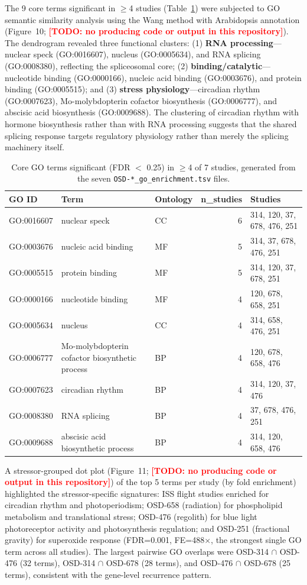 \documentclass[12pt,a4paper]{article}
\newcommand{\TODO}[1]{\textcolor{red}{\textbf{[TODO: #1]}}}
\begin{document}
The 9 core terms significant in $\geq$4 studies (Table~\ref{tab:core_go}) were subjected to GO semantic similarity analysis using the Wang method with Arabidopsis annotation (Figure~10; \TODO{no producing code or output in this repository}). The dendrogram revealed three functional clusters: (1) \textbf{RNA processing}---nuclear speck (GO:0016607), nucleus (GO:0005634), and RNA splicing (GO:0008380), reflecting the spliceosomal core; (2) \textbf{binding/catalytic}---nucleotide binding (GO:0000166), nucleic acid binding (GO:0003676), and protein binding (GO:0005515); and (3) \textbf{stress physiology}---circadian rhythm (GO:0007623), Mo-molybdopterin cofactor biosynthesis (GO:0006777), and abscisic acid biosynthesis (GO:0009688). The clustering of circadian rhythm with hormone biosynthesis rather than with RNA processing suggests that the shared splicing response targets regulatory physiology rather than merely the splicing machinery itself.

\begin{table}[htbp]
\centering
\caption{Core GO terms significant (FDR $<$ 0.25) in $\geq$4 of 7 studies, generated from the seven \texttt{OSD-*\_go\_enrichment.tsv} files.}
\label{tab:core_go}
\small
\begin{tabularx}{\textwidth}{l>{\raggedright\arraybackslash}Xlrl}
\hline
GO ID & Term & Ontology & n\_studies & Studies \\
\hline
GO:0016607 & nuclear speck & CC & 6 & 314, 120, 37, 678, 476, 251 \\
GO:0003676 & nucleic acid binding & MF & 5 & 314, 37, 678, 476, 251 \\
GO:0005515 & protein binding & MF & 5 & 314, 120, 37, 678, 251 \\
GO:0000166 & nucleotide binding & MF & 4 & 120, 678, 658, 251 \\
GO:0005634 & nucleus & CC & 4 & 314, 658, 476, 251 \\
GO:0006777 & Mo-molybdopterin cofactor biosynthetic process & BP & 4 & 120, 678, 658, 476 \\
GO:0007623 & circadian rhythm & BP & 4 & 314, 120, 37, 476 \\
GO:0008380 & RNA splicing & BP & 4 & 37, 678, 476, 251 \\
GO:0009688 & abscisic acid biosynthetic process & BP & 4 & 314, 120, 658, 476 \\
\hline
\end{tabularx}
\end{table}

A stressor-grouped dot plot (Figure~11; \TODO{no producing code or output in this repository}) of the top 5 terms per study (by fold enrichment) highlighted the stressor-specific signatures: ISS flight studies enriched for circadian rhythm and photoperiodism; OSD-658 (radiation) for phospholipid metabolism and translational stress; OSD-476 (regolith) for blue light photoreceptor activity and photosynthesis regulation; and OSD-251 (fractional gravity) for superoxide response (FDR=0.001, FE=488$\times$, the strongest single GO term across all studies). The largest pairwise GO overlaps were OSD-314 $\cap$ OSD-476 (32 terms), OSD-314 $\cap$ OSD-678 (28 terms), and OSD-476 $\cap$ OSD-678 (25 terms), consistent with the gene-level recurrence pattern.
\end{document}
